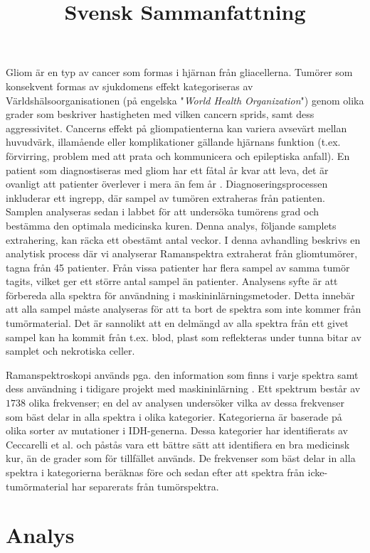 \title{Svensk Sammanfattning}

Gliom är en typ av cancer som formas i hjärnan från gliacellerna. Tumörer som konsekvent formas av sjukdomens effekt kategoriseras av Världshälsoorganisationen (på engelska "\textit{World Health Organization}") genom olika grader som beskriver hastigheten med vilken cancern sprids, samt dess aggressivitet. Cancerns effekt på gliompatienterna kan variera avsevärt mellan huvudvärk, illamående eller komplikationer gällande hjärnans funktion (t.ex. förvirring, problem med att prata och kommunicera och epileptiska anfall). En patient som diagnostiseras med gliom har ett fåtal år kvar att leva, det är ovanligt att patienter överlever i mera än fem år \cite{glialcells, gallego2015nonsurgical, bleeker2012recent}. Diagnoseringsprocessen inkluderar ett ingrepp, där sampel av tumören extraheras från patienten. Samplen analyseras sedan i labbet för att undersöka tumörens grad och bestämma den optimala medicinska kuren. Denna analys, följande samplets extrahering, kan räcka ett obestämt antal veckor. I denna avhandling beskrivs en analytisk process där vi analyserar Ramanspektra extraherat från gliomtumörer, tagna från 45 patienter. Från vissa patienter har flera sampel av samma tumör tagits, vilket ger ett större antal sampel än patienter. Analysens syfte är att förbereda alla spektra för användning i maskininlärningsmetoder. Detta innebär att alla sampel måste analyseras för att ta bort de spektra som inte kommer från tumörmaterial. Det är sannolikt att en delmängd av alla spektra från ett givet sampel kan ha kommit från t.ex. blod, plast som reflekteras under tunna bitar av samplet och nekrotiska celler.

Ramanspektroskopi används pga. den information som finns i varje spektra samt dess användning i tidigare projekt med maskininlärning \cite{ramanDL, ho2019rapid}. Ett spektrum består av $1738$ olika frekvenser; en del av analysen undersöker vilka av dessa frekvenser som bäst delar in alla spektra i olika kategorier. Kategorierna är baserade på olika sorter av mutationer i IDH-generna. Dessa kategorier har identifierats av Ceccarelli et al. \cite{cellsubsets} och påstås vara ett bättre sätt att identifiera en bra medicinsk kur, än de grader som för tillfället används. De frekvenser som bäst delar in alla spektra i kategorierna beräknas före och sedan efter att spektra från icke-tumörmaterial har separerats från tumörspektra.

\section*{Analys}

